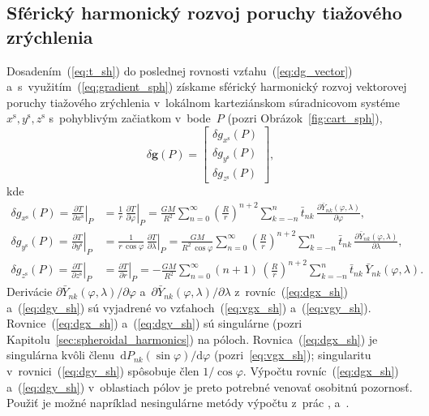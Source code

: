 \documentclass[a4paper, 12pt]{book}
\newcommand{\diff}{\mathrm d}
\let\vec\mathbf
\begin{document}
\subsection{Sférický harmonický rozvoj poruchy tiažového zrýchlenia}

Dosadením~(\ref{eq:t_sh}) do poslednej rovnosti vzťahu~(\ref{eq:dg_vector}) 
a~s~využitím~(\ref{eq:gradient_sph}) získame sférický harmonický rozvoj 
vektorovej poruchy tiažového zrýchlenia v~lokálnom karteziánskom súradnicovom 
systéme~$x^\mathrm{s}, y^\mathrm{s}, z^\mathrm{s}$ s~pohyblivým začiatkom 
v~bode~$P$ (pozri Obrázok~\ref{fig:cart_sph}),
%
\begin{equation}
\label{eq:dg_vec_sph}
\delta \vec g(P) =
%
\begin{bmatrix}
\delta g_{x^\mathrm{s}}(P)\\
\delta g_{y^\mathrm{s}}(P)\\
\delta g_{z^\mathrm{s}}(P)
\end{bmatrix}
%
{,}
\end{equation}
%
kde
%
\begin{align}
\label{eq:dgx_sh}
\delta g_{x^\mathrm{s}}(P) = \left.\frac{\partial T}{\partial 
x^\mathrm{s}}\right|_P &= \frac{1}{r} \, \left.\frac{\partial T}{\partial 
\varphi}\right|_P = \frac{GM}{R^2} \sum_{n = 0}^\infty \left( \frac{R}{r} 
\right)^{n + 2} \sum_{k = -n}^{n} \bar{t}_{nk} \, \frac{\partial 
\bar{Y}_{nk}(\varphi, \lambda)}{\partial \varphi}{,}\\
%
\label{eq:dgy_sh}
\delta g_{y^\mathrm{s}}(P) = \left.\frac{\partial T}{\partial 
y^\mathrm{s}}\right|_P &= \frac{1}{r \, \cos\varphi} \, \left.\frac{\partial 
T}{\partial \lambda}\right|_P = \frac{GM}{R^2 \, \cos\varphi} \sum_{n 
= 0}^\infty \left( \frac{R}{r} \right)^{n + 2} \sum_{k = -n}^{n}\bar{t}_{nk} \, 
\frac{\partial \bar{Y}_{nk}(\varphi, \lambda)}{\partial \lambda}{,}\\
%
\label{eq:dgz_sh}
\delta g_{z^\mathrm{s}}(P) = \left.\frac{\partial T}{\partial 
z^\mathrm{s}}\right|_P &= \left.\frac{\partial T}{\partial r}\right|_P 
= - \frac{GM}{R^2} \sum_{n = 0}^\infty (n + 1) \, \left( \frac{R}{r} \right)^{n 
+ 2} \sum_{k = -n}^{n} \bar{t}_{nk} \, \bar{Y}_{nk}(\varphi, \lambda){.}
\end{align}
%
Derivácie $\partial \bar{Y}_{nk}(\varphi, \lambda) \slash \partial \varphi$ 
a~$\partial \bar{Y}_{nk}(\varphi, \lambda) \slash \partial \lambda$ 
z~rovníc~(\ref{eq:dgx_sh}) a~(\ref{eq:dgy_sh}) sú vyjadrené vo 
vzťahoch~(\ref{eq:vgx_sh}) a~(\ref{eq:vgy_sh}).  Rovnice~(\ref{eq:dgx_sh}) 
a~(\ref{eq:dgy_sh}) sú singulárne (pozri 
Kapitolu~\ref{sec:spheroidal_harmonics}) na póloch.  Rovnica~(\ref{eq:dgx_sh}) 
je singulárna kvôli členu~$\diff P_{nk}(\sin\varphi) \slash \diff \varphi$ 
(pozri~\ref{eq:vgx_sh}); singularitu v~rovnici~(\ref{eq:dgy_sh}) spôsobuje člen 
$1 \slash \cos\varphi$.  Výpočtu rovníc~(\ref{eq:dgx_sh}) a~(\ref{eq:dgy_sh}) 
v~oblastiach pólov je preto potrebné venovať osobitnú pozornosť.  Použiť je 
možné napríklad nesingulárne metódy výpočtu z~prác \textcite{Petrovskaya2012}, 
\textcite{Sebera2013} a~\textcite{Ivanov2018}.
\end{document}
